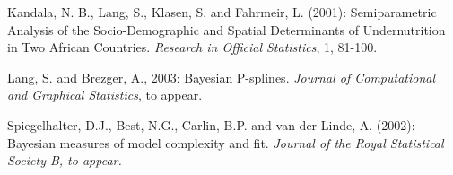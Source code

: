 \documentclass{article}
\begin{document}
\begin{thebibliography}{99}
 Kandala, N. B., Lang,
S., Klasen, S. and Fahrmeir, L. (2001): Semiparametric Analysis of
the Socio-Demographic and Spatial Determinants of Undernutrition
in Two African Countries. {\it Research in Official Statistics},
1, 81-100.

 Lang, S. and
Brezger, A., 2003: Bayesian P-splines. {\it Journal of
Computational and Graphical Statistics}, to appear.

 Spiegelhalter,
D.J., Best, N.G., Carlin, B.P. and van der Linde, A. (2002):
Bayesian measures of model complexity and fit. {\it Journal of the
Royal Statistical Society B, to appear.}

\end{thebibliography}
\end{document}
